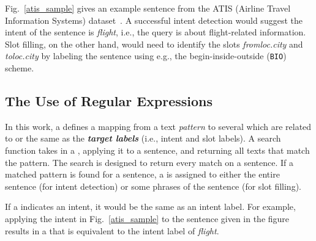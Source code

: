 
 Fig.~\ref{atis_sample} gives an example sentence from the ATIS (Airline Travel Information Systems)
dataset~\cite{hemphill1990atis}. A successful intent detection would suggest the intent of the sentence is \emph{flight}, i.e., the query
is about flight-related information. Slot filling, on the other hand, would need to identify the slots \emph{fromloc.city} and
\emph{toloc.city} by labeling the sentence using e.g., the begin-inside-outside (\texttt{BIO}) scheme.




\subsection{The Use of Regular Expressions}
\label{re_desc}

In this work, a \RE defines a mapping from a text \emph{pattern} to several \textbf{\emph{\REtags}} which are related to or the same as the
\textbf{\emph{target labels}} (i.e., intent and slot labels). A search function takes in a \RE, applying it to a sentence, and returning
all texts that match the pattern. The search is designed to return every match on a sentence. If a matched pattern is found for a sentence,
a \REtag is assigned to either the entire sentence (for intent detection) or some phrases of the sentence (for slot filling).


 If a \REtag indicates an intent, it would be the same as an intent label. For example, applying the intent
\RE in Fig.~\ref{atis_sample} to the sentence given in the figure results in a \REtag that is equivalent to the intent label of
\emph{flight}.



